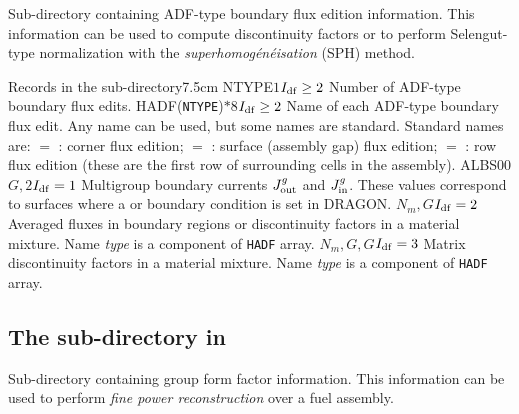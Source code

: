 Sub-directory containing ADF-type boundary flux edition information. This information can be used to compute
discontinuity factors or to perform Selengut-type normalization with the {\sl superhomog\'en\'eisation} (SPH) method.

\begin{DescriptionEnregistrement}{Records in the  sub-directory}{7.5cm}
\OptIntEnr
  {NTYPE}{$1$}{$I_{\rm df} \ge 2$}
  {Number of ADF-type boundary flux edits.}
\OptCharEnr
  {HADF}{({\tt NTYPE})$*8$}{$I_{\rm df} \ge 2$}
  {Name of each ADF-type boundary flux edit. Any name can be used, but some
  names are standard. Standard names are: $=$ :
  corner flux edition; $=$ : surface (assembly gap) flux edition; $=$ :
  row flux edition (these are the first row of surrounding cells in the assembly).}
\OptRealEnr
  {ALBS00}{$G,2$}{$I_{\rm df} = 1$}{}
  {Multigroup boundary currents $J^{g}_{\rm out}$ and $J^{g}_{\rm in}$. These values correspond to surfaces where
  a  or  boundary condition is set in DRAGON.}
\OptRealVar
  {}{$N_{m},G$}{$I_{\rm df} = 2$}{}
  {Averaged fluxes in boundary regions or discontinuity factors in a material mixture. Name {\sl type} is a component of {\tt HADF} array.}
\OptRealVar
  {}{$N_{m},G,G$}{$I_{\rm df} = 3$}{}
  {Matrix discontinuity factors in a material mixture. Name {\sl type} is a component of {\tt HADF} array.}
\end{DescriptionEnregistrement}

\subsection{The  sub-directory in }\label{sect:macroGFF}

Sub-directory containing group form factor information. This information can be used to perform
{\sl fine power reconstruction} over a fuel assembly.

